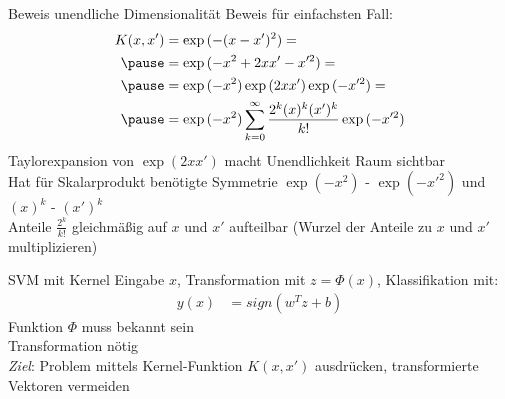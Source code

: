 \documentclass[ngerman]{beamer}
\begin{document}
\begin{frame}{Beweis unendliche Dimensionalität}
    Beweis für einfachsten Fall: \\ \pause
    \begin{equation*} \label{eq:proof_rbfk_infinite_pres}
    \begin{aligned}
        K(x, x') &= \exp{(-(x - x')^{2})} =\\ \pause
        &= \exp{(-x^{2} + 2xx' - x'^{2})} = \\ \pause
        &= \exp{(-x^{2})} \exp{(2xx')} \exp{(-x'^{2})} = \\ \pause
        &= \exp{(-x^{2})} \sum_{k=0}^{\infty} \frac{2^{k} (x)^{k} (x')^{k}}{k!} \exp{(-x'^{2})}
    \end{aligned}
    \end{equation*} \pause
    Taylorexpansion von $\exp{(2xx')}$ macht Unendlichkeit Raum sichtbar \\ \pause
    Hat für Skalarprodukt benötigte Symmetrie $\exp(-x^{2})$ - $\exp(-x'^{2})$ und $(x)^{k}$ - $(x')^{k}$ \\ \pause
    Anteile $\frac{2^k}{k!}$ gleichmäßig auf $x$ und $x'$ aufteilbar (Wurzel der Anteile zu $x$ und $x'$ multiplizieren)
\end{frame}

\begin{frame}{SVM mit Kernel}
    Eingabe $x$, Transformation mit  $z = \Phi(x)$, Klassifikation mit: \\ \pause
    \begin{equation} \label{eq:svm_def_kernel_pres}
    \begin{aligned}
        y(x) &= sign(w^{T} z + b)
    \end{aligned}
    \end{equation} \pause
    Funktion $\Phi$ muss bekannt sein \\ \pause
    Transformation nötig \\ \pause
    \emph{Ziel}: Problem mittels Kernel-Funktion $K(x, x')$ ausdrücken, transformierte Vektoren vermeiden
\end{frame}
\end{document}
